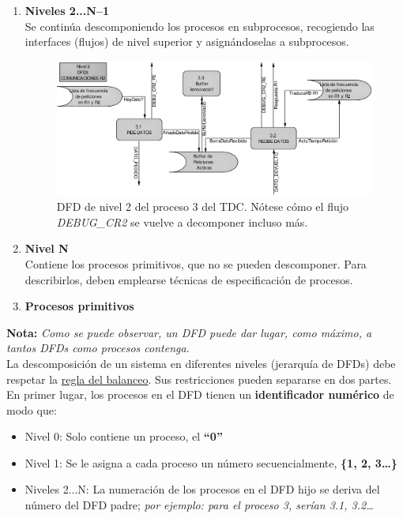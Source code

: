 \begin{enumerate}
\begin{figure}[h!]
              \label{fig:dfdn1}
          \end{figure}
    \item \textbf{Niveles 2...N--1}\\
          Se continúa descomponiendo los procesos en subprocesos, recogiendo las interfaces (flujos) de nivel superior y asignándoselas a subprocesos.
          \begin{figure}[h!]
              \centering
              \includegraphics[width=0.7\linewidth]{Resources/Tema5/nivel2_Proceso3_DFD.png}
              \caption{DFD de nivel 2 del proceso $3$ del TDC. Nótese cómo el flujo \textit{DEBUG\_CR2} se vuelve a decomponer incluso más.}
              \label{fig:dfdn2}
          \end{figure}
    \item \textbf{Nivel N}\\
          Contiene los procesos primitivos, que no se pueden descomponer. Para describirlos, deben emplearse técnicas de especificación de procesos.
    \item \textbf{Procesos primitivos}
\end{enumerate}

\textbf{Nota:} \textit{Como se puede observar, un DFD puede dar lugar, como máximo, a tantos DFDs como procesos contenga.}\\

La descomposición de un sistema en diferentes niveles (jerarquía de DFDs) debe respetar la \uline{regla del balanceo}. Sus restricciones pueden separarse en dos partes.\\

En primer lugar, los procesos en el DFD tienen un \textbf{identificador numérico} de modo que:
\begin{itemize}
    \item Nivel 0: Solo contiene un proceso, el \textbf{``0''}
    \item Nivel 1: Se le asigna a cada proceso un número secuencialmente, \textbf{\{1, 2, 3\ldots\}}
    \item Niveles 2...N: La numeración de los procesos en el DFD hijo se deriva del número del DFD padre; \textit{por ejemplo: para el proceso 3, serían 3.1, 3.2\ldots}
\end{itemize}

